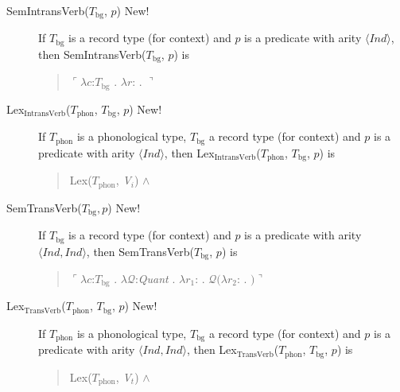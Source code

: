 \begin{description}
      \item[\textnormal{SemIntransVerb($T_{\mathrm{bg}}$, $p$)} New!]
        \mbox{}

        If $T_{\text{bg}}$ is a record type (for context) and $p$ is a
        predicate with arity $\langle\textit{Ind}\rangle$, then SemIntransVerb($T_{\mathrm{bg}}$, $p$) is
        \begin{quote}
          $\ulcorner\lambda c$:$T_{\mathrm{bg}}$ . $\lambda
          r$:
          . $\urcorner$
        \end{quote}

        
      \item[\textnormal{Lex$_{\mathrm{IntransVerb}}$($T_{\mathrm{phon}}$,
          $T_{\mathrm{bg}}$, $p$)} New!] \mbox{}

        If $T_{\mathrm{phon}}$ is a phonological type,
        $T_{\mathrm{bg}}$ a record type (for context) and $p$ is a
        predicate with arity $\langle\textit{Ind}\rangle$, then Lex$_{\mathrm{IntransVerb}}$($T_{\mathrm{phon}}$,
        $T_{\mathrm{bg}}$, $p$) is
        \begin{quote}
          Lex($T_{\mathrm{phon}}$, \textit{V$_i$}) \d{$\wedge$}
        \end{quote}

        
      \item[\textnormal{SemTransVerb($T_{\mathrm{bg}}, p$)} New!] \mbox{}

        If $T_{\text{bg}}$ is a record type (for context) and $p$ is a
        predicate with arity $\langle\textit{Ind},\textit{Ind}\rangle$, then SemTransVerb($T_{\mathrm{bg}}$, $p$) is
        \begin{quote}
          $\ulcorner\lambda c$:$T_{\mathrm{bg}}$ . $\lambda
          \mathcal{Q}$:\textit{Quant} . $\lambda
          r_1$: . $\mathcal{Q}(\lambda r_2$:
          . $)\urcorner$
        \end{quote}
        
\item[\textnormal{Lex$_{\mathrm{TransVerb}}$($T_{\mathrm{phon}}$,
          $T_{\mathrm{bg}}$, $p$)} New!] \mbox{}

        If $T_{\mathrm{phon}}$ is a phonological type,
        $T_{\mathrm{bg}}$ a record type (for context) and $p$ is a
        predicate with arity $\langle\textit{Ind},\textit{Ind}\rangle$, then Lex$_{\mathrm{TransVerb}}$($T_{\mathrm{phon}}$,
        $T_{\mathrm{bg}}$, $p$) is
        \begin{quote}
          Lex($T_{\mathrm{phon}}$, \textit{V$_t$}) \d{$\wedge$}
        \end{quote}


\end{description}
